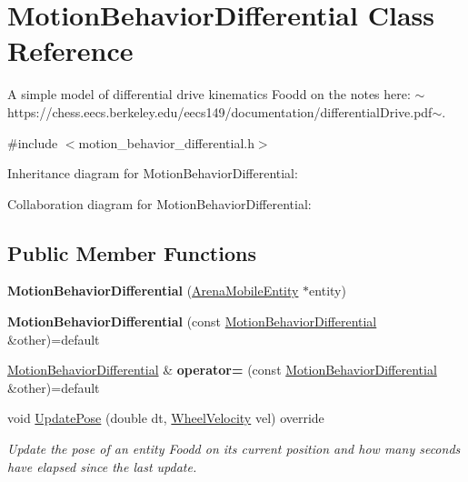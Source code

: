 \hypertarget{classMotionBehaviorDifferential}{}\section{Motion\+Behavior\+Differential Class Reference}
\label{classMotionBehaviorDifferential}


A simple model of differential drive kinematics Foodd on the notes here\+: $\sim$https\+://chess.eecs.\+berkeley.\+edu/eecs149/documentation/differential\+Drive.pdf$\sim$.  




{\ttfamily \#include $<$motion\+\_\+behavior\+\_\+differential.\+h$>$}



Inheritance diagram for Motion\+Behavior\+Differential\+:


Collaboration diagram for Motion\+Behavior\+Differential\+:
\subsection*{Public Member Functions}
\begin{DoxyCompactItemize}
\item 
{\bfseries Motion\+Behavior\+Differential} (\hyperlink{classArenaMobileEntity}{Arena\+Mobile\+Entity} $\ast$entity)\hypertarget{classMotionBehaviorDifferential_a8815791ac85212945862454560279d28}{}\label{classMotionBehaviorDifferential_a8815791ac85212945862454560279d28}

\item 
{\bfseries Motion\+Behavior\+Differential} (const \hyperlink{classMotionBehaviorDifferential}{Motion\+Behavior\+Differential} \&other)=default\hypertarget{classMotionBehaviorDifferential_aeaa480aac3de205e1d177c4b4ad73ed6}{}\label{classMotionBehaviorDifferential_aeaa480aac3de205e1d177c4b4ad73ed6}

\item 
\hyperlink{classMotionBehaviorDifferential}{Motion\+Behavior\+Differential} \& {\bfseries operator=} (const \hyperlink{classMotionBehaviorDifferential}{Motion\+Behavior\+Differential} \&other)=default\hypertarget{classMotionBehaviorDifferential_aaf4edbc2e349cb8cdbb033b16b1aef22}{}\label{classMotionBehaviorDifferential_aaf4edbc2e349cb8cdbb033b16b1aef22}

\item 
void \hyperlink{classMotionBehaviorDifferential_a929c3a05aa2072acf2a508109b1259ef}{Update\+Pose} (double dt, \hyperlink{structWheelVelocity}{Wheel\+Velocity} vel) override
\begin{DoxyCompactList}\small\item\em Update the pose of an entity Foodd on its current position and how many seconds have elapsed since the last update. \end{DoxyCompactList}\end{DoxyCompactItemize}
